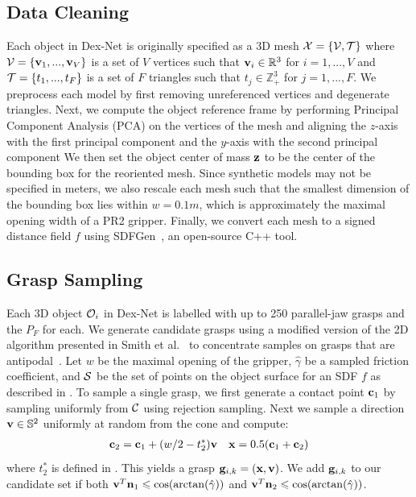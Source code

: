 \subsection{Data Cleaning}
Each object in Dex-Net is originally specified as a 3D mesh $\mathcal{X} = \{\mathcal{V}, \mathcal{T}\}$ where $\mathcal{V} = \{\mathbf{v}_1, ..., \mathbf{v}_V\}$ is a set of $V$ vertices such that $\mathbf{v}_i \in \mathbb{R}^3$ for $i = 1, ..., V$ and $\mathcal{T} = \{t_1, ..., t_F\}$  is a set of $F$ triangles such that $t_j \in \mathbb{Z}_{+}^3$ for $j = 1, ..., F$.
We preprocess each model by first removing unreferenced vertices and degenerate triangles.
Next, we compute the object reference frame by performing Principal Component Analysis (PCA) on the vertices of the mesh and aligning the $z$-axis with the first principal component and the $y$-axis with the second principal component
We then set the object center of mass $\mathbf{z}$ to be the center of the bounding box for the reoriented mesh.
Since synthetic models may not be specified in meters, we also rescale each mesh such that the smallest dimension of the bounding box lies within $w = 0.1m$, which is approximately the maximal opening width of a PR2 gripper.
Finally, we convert each mesh to a signed distance field $f$ using SDFGen~\cite{sdfgen}, an open-source C++ tool.

\subsection{Grasp Sampling}
Each 3D object $\mathcal{O}_i$ in Dex-Net is labelled with up to 250 parallel-jaw grasps and the $P_F$ for each.
We generate candidate grasps using a modified version of the 2D algorithm presented in Smith et al.~\cite{smith1999computing} to concentrate samples on grasps that are antipodal~\cite{mahler2015gp}.
Let $w$ be the maximal opening of the gripper, $\hat{\gamma}$ be a sampled friction coefficient, and $\mathcal{S} $ be the set of points on the object surface for an SDF $f$ as described in .
To sample a single grasp, we first generate a contact point $\mathbf{c}_1$ by sampling uniformly from $\mathcal{C}$ using rejection sampling.
Next we sample a direction $\mathbf{v} \in \mathbb{S}^2$ uniformly at random from the cone and compute:
\begin{align*}
	\mathbf{c}_2 = \mathbf{c}_1 + (w / 2 - t_2^*) \mathbf{v}  &&  \mathbf{x} = 0.5 (\mathbf{c}_1 + \mathbf{c}_2)
\end{align*}
\noindent where $t_2^*$ is defined in .
This yields a grasp $\mathbf{g}_{i,k} = (\mathbf{x}, \mathbf{v})$.
We add $\mathbf{g}_{i,k}$ to our candidate set if both $\mathbf{v}^T \mathbf{n}_1 \leqslant \cos(\arctan(\hat{\gamma}))$ and $\mathbf{v}^T \mathbf{n}_2 \leqslant \cos(\arctan(\hat{\gamma}))$.

